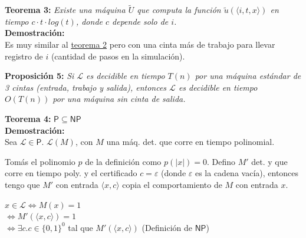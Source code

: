 \documentclass{article}
\begin{document}
\begin{flushleft}
  \textbf{Teorema 3:}
  \textit{Existe una máquina $\widetilde{U}$ que computa la función $\widetilde{u}(\langle i,t,x \rangle)$
  en tiempo $c \cdot t \cdot log(t)$, donde $c$ depende solo de $i$.} \\[0.5em]

  \textbf{\textcolor{Mulberry}{Demostración:}} \\[0.5em]

  Es muy similar al \hyperlink{teo2}{\textcolor{Rhodamine}{teorema 2}} pero con una cinta más de trabajo
  para llevar registro de $i$ (cantidad de pasos en la simulación).
\end{flushleft}

\begin{flushleft}
  \textbf{Proposición 5:}
  \textit{Si $\mathcal{L}$ es decidible en tiempo $T(n)$ por una máquina estándar de 3 cintas (entrada,
  trabajo y salida), entonces $\mathcal{L}$ es decidible en tiempo $O(T(n))$ por una máquina sin cinta
  de salida.}
\end{flushleft}


\begin{flushleft}
  \textbf{Teorema 4:}
  $\mathsf{P} \subseteq \mathsf{NP}$ \\[0.5em]

  \textbf{\textcolor{Mulberry}{Demostración:}} \\[0.5em]

  Sea $\mathcal{L} \in \mathsf{P}$. $\mathcal{L}(M)$, con $M$ una máq. det. que corre en tiempo 
  polinomial.

  Tomás el polinomio $p$ de la definición como $p(|x|) = 0$. Defino $M'$ det. y que corre en tiempo poly.
  y el certificado $c = \varepsilon$ (donde $\varepsilon$ es la cadena vacía), entonces tengo que $M'$ con 
  entrada $\langle x,c \rangle$ copia el comportamiento de $M$ con entrada $x$.
\end{flushleft}

\begin{center}
  $x \in \mathcal{L} \iff M(x) = 1$  \\
  $\iff M'(\langle x,c \rangle) = 1$  \\
  $\iff \exists c. c\in \{0,1\}^0$ tal que $M'(\langle x,c \rangle)$ (Definición de $\mathsf{NP}$)
\end{center}
\end{document}
